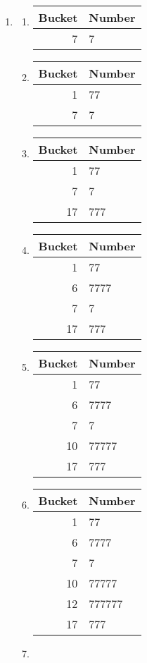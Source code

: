 \documentclass[12pt]{article}
\begin{document}
\begin{enumerate}[a]
	\item %
	\begin{multicols}{2}
	\begin{enumerate}[1]
		\item
		\begin{tabular}{r|l}
			Bucket & Number\\\hline\hline
			7 & 7
		\end{tabular}
		\item
		\begin{tabular}{r|l}
			Bucket & Number\\\hline\hline
			1 & 77\\\hline
			7 & 7
		\end{tabular}
		\item
		\begin{tabular}{r|l}
			Bucket & Number\\\hline\hline
			1 & 77\\\hline
			7 & 7\\\hline
			17 & 777
		\end{tabular}
		\item
		\begin{tabular}{r|l}
			Bucket & Number\\\hline\hline
			1 & 77\\\hline
			6 & 7777\\\hline
			7 & 7\\\hline
			17 & 777
		\end{tabular}
		\item
		\begin{tabular}{r|l}
			Bucket & Number\\\hline\hline
			1 & 77\\\hline
			6 & 7777\\\hline
			7 & 7\\\hline
			10 & 77777\\\hline
			17 & 777
		\end{tabular}
		\item
		\begin{tabular}{r|l}
			Bucket & Number\\\hline\hline
			1 & 77\\\hline
			6 & 7777\\\hline
			7 & 7\\\hline
			10 & 77777\\\hline
			12 & 777777\\\hline
			17 & 777
		\end{tabular}
		\item

\end{enumerate}
\end{multicols}
\end{enumerate}
\end{document}
